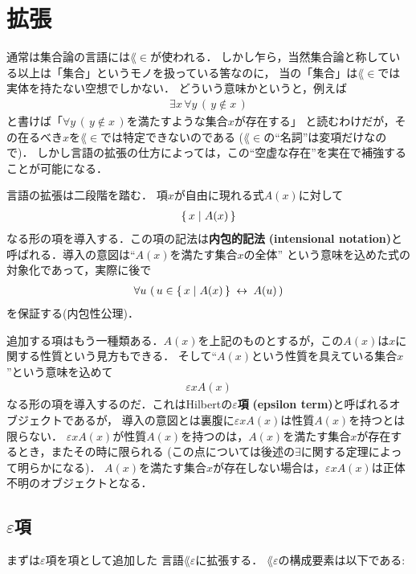 \section{拡張}
	通常は集合論の言語には$\lang{\in}$が使われる．
	しかし乍ら，当然集合論と称している以上は「集合」というモノを扱っている筈なのに，
	当の「集合」は$\lang{\in}$では実体を持たない空想でしかない．
	どういう意味かというと，例えば
	\begin{align}	
		\exists x\, \forall y\, (\, y \notin x\, )
	\end{align}
	と書けば「$\forall y\, (\, y \notin x\, )$を満たすような集合$x$が存在する」
	と読むわけだが，その在るべき$x$を$\lang{\in}$では特定できないのである
	($\lang{\in}$の``名詞''は変項だけなので)．
	しかし言語の拡張の仕方によっては，この``空虚な存在''を実在で補強することが可能になる．
	
	言語の拡張は二段階を踏む．
	項$x$が自由に現れる式$A(x)$に対して
	\begin{align}
		\{\, x \mid A(x)\, \}
	\end{align}
	なる形の項を導入する．この項の記法は{\bf 内包的記法}
	{\bf (intensional notation)}と呼ばれる．導入の意図は``$A(x)$を満たす集合$x$の全体''
	という意味を込めた式の対象化であって，実際に後で
	\begin{align}
		\forall u\, \left(\, u \in \{\, x \mid A(x)\, \} \hspace{0.25em}\leftrightarrow\hspace{0.25em} A(u)\, \right)
	\end{align}
	を保証する(内包性公理)．
	
	追加する項はもう一種類ある．$A(x)$を上記のものとするが，この$A(x)$は$x$に関する性質という見方もできる．
	そして``$A(x)$という性質を具えている集合$x$''という意味を込めて
	\begin{align}
		\varepsilon x A(x)
	\end{align}
	なる形の項を導入するのだ．これはHilbertの{\bf $\varepsilon$項}
	{\bf (epsilon term)}と呼ばれるオブジェクトであるが，
	導入の意図とは裏腹に$\varepsilon x A(x)$は性質$A(x)$を持つとは限らない．
	$\varepsilon x A(x)$が性質$A(x)$を持つのは，$A(x)$を満たす集合$x$が存在するとき，またその時に限られる
	(この点については後述の$\exists$に関する定理によって明らかになる)．
	$A(x)$を満たす集合$x$が存在しない場合は，$\varepsilon x A(x)$は正体不明のオブジェクトとなる．
	
\subsection{$\varepsilon$項}
	まずは$\varepsilon$項を項として追加した
	言語$\lang{\varepsilon}$に拡張する．
	$\lang{\varepsilon}$の構成要素は以下である:
	
